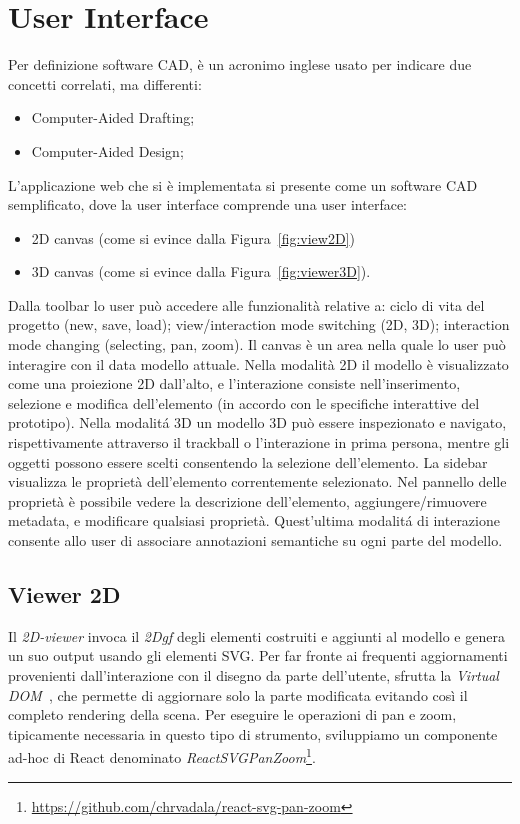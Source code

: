 \newpage
\section{User Interface}
\label{sec:chapter_2_section_4}

Per definizione software CAD, è un acronimo inglese usato per indicare due concetti correlati, ma differenti:
\begin{itemize}
  \item Computer-Aided Drafting;
  \item Computer-Aided Design;
\end{itemize}
L'applicazione web che si è implementata si presente come un software CAD semplificato, dove la
user interface comprende una user interface:
\begin{itemize}
  \item 2D canvas (come si evince dalla Figura~\ref{fig:view2D})
  \item 3D canvas (come si evince dalla Figura~\ref{fig:viewer3D}).
\end{itemize}
Dalla toolbar lo user pu\`o accedere alle funzionalit\`a relative a: ciclo di vita del progetto (new, save, load);
view/interaction mode switching (2D, 3D); interaction mode changing (selecting, pan, zoom).
Il canvas \`e un area nella quale lo user pu\`o interagire con il data modello attuale. Nella modalit\`a 2D
il modello \`e visualizzato come una proiezione 2D dall'alto, e l'interazione consiste nell'inserimento, selezione e modifica
dell'elemento (in accordo con le specifiche interattive del prototipo). Nella modalit\'a 3D un modello 3D pu\`o essere
inspezionato e navigato, rispettivamente attraverso il trackball o l'interazione in prima persona, mentre gli oggetti
possono essere scelti consentendo la selezione dell'elemento.
La sidebar visualizza le propriet\`a dell'elemento correntemente selezionato. Nel pannello delle propriet\`a \`e possibile
vedere la descrizione dell'elemento, aggiungere/rimuovere metadata, e modificare qualsiasi propriet\`a.
Quest'ultima modalit\'a di interazione consente allo user di associare annotazioni semantiche su ogni parte del modello.
\newpage

\subsection{Viewer 2D}
Il \emph{2D-viewer} invoca il \emph{2Dgf} degli elementi costruiti e aggiunti al modello e genera un suo output usando
gli elementi SVG.
Per far fronte ai frequenti aggiornamenti provenienti dall'interazione con il disegno da parte dell'utente,
sfrutta la \emph{Virtual DOM}~\cite{vdom}, che permette di aggiornare solo la parte modificata evitando così
il completo rendering della scena. Per eseguire le operazioni di pan e zoom, tipicamente necessaria in questo
tipo di strumento, sviluppiamo un componente ad-hoc
di React denominato \emph{ReactSVGPanZoom}\footnote{\url{https://github.com/chrvadala/react-svg-pan-zoom}}.\\


